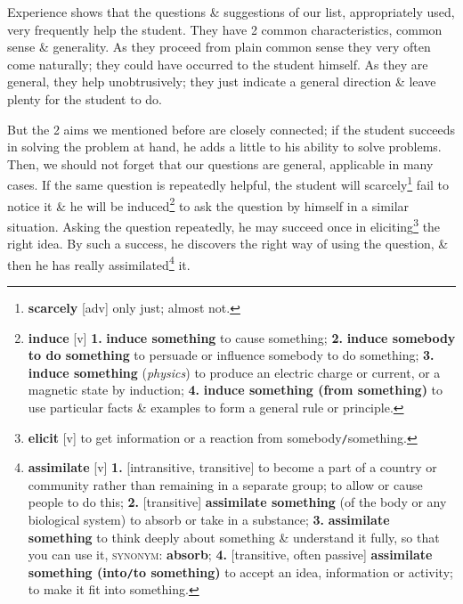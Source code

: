 \documentclass[oneside]{book}
\numberwithin{equation}{section}
\begin{document}
Experience shows that the questions \& suggestions of our list, appropriately used, very frequently help the student. They have 2 common characteristics, common sense \& generality. As they proceed from plain common sense they very often come naturally; they could have occurred to the student himself. As they are general, they help unobtrusively; they just indicate a general direction \& leave plenty for the student to do.

But the 2 aims we mentioned before are closely connected; if the student succeeds in solving the problem at hand, he adds a little to his ability to solve problems. Then, we should not forget that our questions are general, applicable in many cases. If the same question is repeatedly helpful, the student will scarcely\footnote{\textbf{scarcely} [adv] only just; almost not.} fail to notice it \& he will be induced\footnote{\textbf{induce} [v] \textbf{1.} \textbf{induce something} to cause something; \textbf{2.} \textbf{induce somebody to do something} to persuade or influence somebody to do something; \textbf{3.} \textbf{induce something} (\textit{physics}) to produce an electric charge or current, or a magnetic state by induction; \textbf{4.} \textbf{induce something (from something)} to use particular facts \& examples to form a general rule or principle.} to ask the question by himself in a similar situation. Asking the question repeatedly, he may succeed once in eliciting\footnote{\textbf{elicit} [v] to get information or a reaction from somebody\texttt{/}something.} the right idea. By such a success, he discovers the right way of using the question, \& then he has really assimilated\footnote{\textbf{assimilate} [v] \textbf{1.} [intransitive, transitive] to become a part of a country or community rather than remaining in a separate group; to allow or cause people to do this; \textbf{2.} [transitive] \textbf{assimilate something} (of the body or any biological system) to absorb or take in a substance; \textbf{3.} \textbf{assimilate something} to think deeply about something \& understand it fully, so that you can use it, \textsc{synonym}: \textbf{absorb}; \textbf{4.} [transitive, often passive] \textbf{assimilate something (into\texttt{/}to something)} to accept an idea, information or activity; to make it fit into something.} it.
\end{document}
